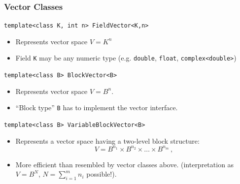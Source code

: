 \begin{frame} \frametitle{Vector Classes}
  \begin{block}{\lstinline!template<class K, int n> FieldVector<K,n>!}
    \begin{itemize}
    \item Represents vector space $V=K^n$
    \item Field \lstinline!K! may be any numeric type (e.g.
      \lstinline!double!, \lstinline!float!,
      \lstinline!complex<double>!)
    \end{itemize}
  \end{block}
  \begin{block}{\lstinline!template<class B> BlockVector<B>!}
    \begin{itemize}
  \item Represents vector space $V=B^n$.
  \item ``Block type'' \lstinline!B! has to implement the vector
    interface.
\end{itemize}
  \end{block}
  \begin{block}{\lstinline!template<class B> VariableBlockVector<B>!}
    \begin{itemize}
    \item Represents a vector space having a two-level
      block structure:
      $$V=B^{n_1}\times B^{n_2}\times\ldots \times B^{n_m}\,,$$
    \item More efficient than resembled by vector classes above.
      (interpretation as $V=B^N$,  $N={\sum_{i=1}^{m} n_i}$ possible!).
    \end{itemize}
  \end{block}
\end{frame}
